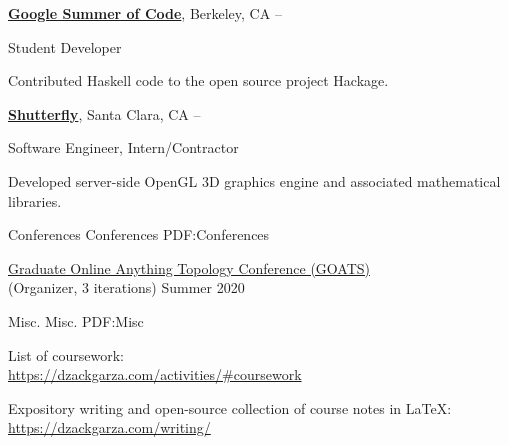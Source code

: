 \documentclass[letterpaper,MMMyyyy,nonstopmode]{simpleresumecv}
\begin{document}
\begin{Body}
\BigGap
\Entry
\href{https://summerofcode.withgoogle.com/archive/}
{\textbf{Google Summer of Code}},
Berkeley, CA
\hfill
{} --

\Gap
\BulletItem
Student Developer

\begin{Detail}
\SubBulletItem
Contributed Haskell code to the open source project Hackage.
\end{Detail}


\BigGap
\Entry
\href{http://www.shutterfly.com/}
{\textbf{Shutterfly}},
Santa Clara, CA
\hfill
{} --

\Gap
\BulletItem
Software Engineer, Intern/Contractor
\begin{Detail}
\SubBulletItem
Developed server-side OpenGL 3D graphics engine and associated mathematical libraries.
\end{Detail}



\Section
{Conferences}
{Conferences}
{PDF:Conferences}

\Gap
\BulletItem \href{https://dzackgarza.com/GOATS_2020/}{Graduate Online Anything Topology Conference (GOATS)} \\
(Organizer, 3 iterations)
\hfill Summer 2020


\Section
{Misc.}
{Misc.}
{PDF:Misc}

\BulletItem 
List of coursework: \\
\href{https://dzackgarza.com/activities/#coursework}{https://dzackgarza.com/activities/#coursework}

\BulletItem 
Expository writing and open-source collection of course notes in \LaTeX: \\
\href{https://dzackgarza.com/writing/}{https://dzackgarza.com/writing/}

\end{Body}
\end{document}
